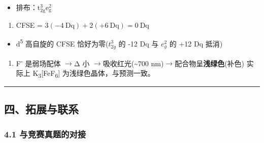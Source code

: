 \documentclass[a4paper,11pt]{ctexart}
\providecommand{\tightlist}{\setlength{\itemsep}{0pt}\setlength{\parskip}{0pt}}
\newcommand{\箭}{\ensuremath{\rightarrow}}
\newcommand{\左箭}{\ensuremath{\leftarrow}}
\newcommand{\上箭}{\ensuremath{\uparrow}}
\newcommand{\下箭}{\ensuremath{\downarrow}}
\newcommand{\衡}{\ensuremath{\rightleftharpoons}}
\newcommand{\双箭}{\ensuremath{\leftrightarrow}}
\newcommand{\约等于}{\ensuremath{\approx}}
\newcommand{\小于等于}{\ensuremath{\leq}}
\newcommand{\大于等于}{\ensuremath{\geq}}
\newcommand{\不等于}{\ensuremath{\neq}}
\newcommand{\西格马}{\ensuremath{\sigma}}
\newcommand{\派}{\ensuremath{\pi}}
\begin{document}
\begin{itemize}
\tightlist
\item
  排布：\(\mathrm{t_{2g}^3 e_g^2}\)
\end{itemize}

\begin{enumerate}
\def\labelenumi{(\arabic{enumi})}
\setcounter{enumi}{2}
\tightlist
\item
  CFSE = \(3(-4\ \mathrm{Dq}) + 2(+6\ \mathrm{Dq}) = 0\ \mathrm{Dq}\)
\end{enumerate}

\begin{itemize}
\tightlist
\item
  d\textsuperscript{5} 高自旋的 CFSE 恰好为零(\(t_{2g}^3\) 的 -12 Dq 与 \(e_g^2\) 的 +12 Dq 抵消)
\end{itemize}

\begin{enumerate}
\def\labelenumi{(\arabic{enumi})}
\setcounter{enumi}{3}
\tightlist
\item
  F\textsuperscript{-} 是弱场配体 \箭 Δ 小 \箭 吸收红光(\textasciitilde700 nm)\箭 配合物呈\textbf{浅绿色}(补色)
  实际上 K\textsubscript{3}{[}FeF\textsubscript{6}{]} 为浅绿色晶体，与预测一致。
\end{enumerate}

\begin{center}\rule{0.5\linewidth}{0.5pt}\end{center}

\subsection{四、拓展与联系}\label{ux56dbux62d3ux5c55ux4e0eux8054ux7cfb}

\subsubsection{4.1 与竞赛真题的对接}\label{ux4e0eux7adeux8d5bux771fux9898ux7684ux5bf9ux63a5}
\end{document}
